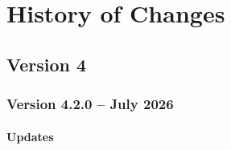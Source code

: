 \chapter{History of Changes}
\label{history}

\renewcommand{\thesection}{}
\renewcommand{\thesubsection}{\arabic{section}.\arabic{subsection}}
\makeatletter
\def\@seccntformat#1{\csname #1ignore\expandafter\endcsname\csname the#1\endcsname\quad}
\let\sectionignore\@gobbletwo
\let\latex@numberline\numberline
\def\numberline#1{\if\relax#1\relax\else\latex@numberline{#1}\fi}
\makeatother


\section{Version 4}


\subsection*{Version 4.2.0 -- July 2026}

\subsubsection*{ Updates}

